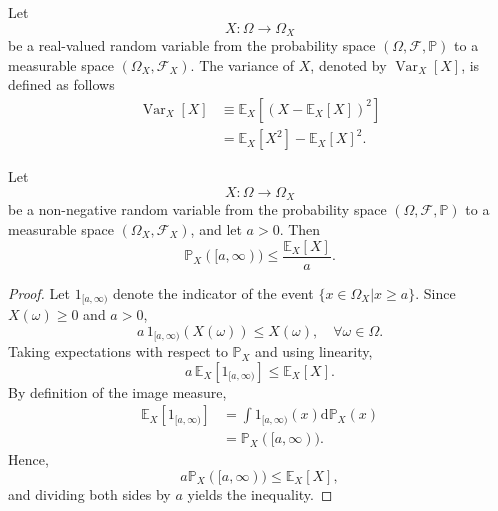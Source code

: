 \begin{definition}[Variance]
	\label{def:variance}
	Let 
	\begin{equation}
		X\colon \Omega \to \Omega_X
	\end{equation}
	be a real-valued random variable from the probability space $(\Omega, \mathcal{F}, \mathbb{P})$ to a measurable space $(\Omega_X, \mathcal{F}_X)$. The variance of $X$, denoted by $\operatorname{Var}_X[X]$, is defined as follows
	\begin{equation}
		\begin{split}
			\operatorname{Var}_X[X]&\equiv \mathbb{E}_X[(X-\mathbb{E}_X[X])^2]\\
			&= \mathbb{E}_X[X^2]-\mathbb{E}_X[X]^2.
		\end{split}
	\end{equation}
\end{definition}

\begin{theorem}
	\label{thm:markov}
	Let 
	\begin{equation}
		X\colon \Omega \to \Omega_X
	\end{equation}
	be a non-negative random variable from the probability space $(\Omega, \mathcal{F}, \mathbb{P})$ to a measurable space $(\Omega_X, \mathcal{F}_X)$, and let $a > 0$. Then
	\begin{equation}
		\mathbb{P}_X([a, \infty)) \le \frac{\mathbb{E}_X[X]}{a}.
	\end{equation}
\end{theorem}

\begin{proof}
	Let $1_{[a,\infty)}$ denote the indicator of the event $\{x \in \Omega_X | x \ge a\}$.  
	Since $X(\omega)\ge 0$ and $a>0$,
	\begin{equation}
		a\,1_{[a,\infty)}(X(\omega)) \le X(\omega), \quad \forall \omega \in \Omega.
	\end{equation}
	Taking expectations with respect to $\mathbb{P}_X$ and using linearity,
	\begin{equation}
		a\,\mathbb{E}_X[1_{[a,\infty)}] \le \mathbb{E}_X[X].
	\end{equation}
	By definition of the image measure,
	\begin{equation}
		\begin{split}
			\mathbb{E}_X[1_{[a,\infty)}] &= \int 1_{[a,\infty)}(x) \mathrm{d}\mathbb{P}_X(x)\\
			& = \mathbb{P}_X([a,\infty)).
		\end{split}
	\end{equation}
	Hence,
	\begin{equation}
		a \mathbb{P}_X([a,\infty)) \leq \mathbb{E}_X[X],
	\end{equation}
	and dividing both sides by $a$ yields the inequality.
\end{proof}

